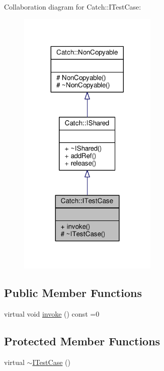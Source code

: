 Collaboration diagram for Catch\-:\-:I\-Test\-Case\-:
\nopagebreak
\begin{figure}[H]
\begin{center}
\leavevmode
\includegraphics[width=188pt]{struct_catch_1_1_i_test_case__coll__graph}
\end{center}
\end{figure}
\subsection*{Public Member Functions}
\begin{DoxyCompactItemize}
\item 
virtual void \hyperlink{struct_catch_1_1_i_test_case_a678825e62e7c17297621cfeb65588c34}{invoke} () const =0
\end{DoxyCompactItemize}
\subsection*{Protected Member Functions}
\begin{DoxyCompactItemize}
\item 
virtual \hyperlink{struct_catch_1_1_i_test_case_add7b9bec455ac1b007c17df82144310e}{$\sim$\-I\-Test\-Case} ()
\end{DoxyCompactItemize}


